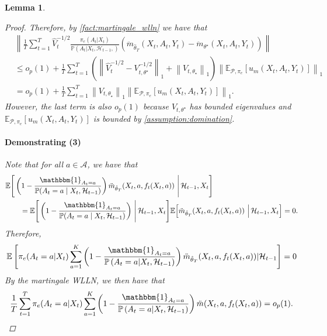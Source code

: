 \documentclass[11pt]{article}
\newcommand{\E}{\mathbb{E}}
\newcommand{\norm}[1]{\left\lVert#1\right\rVert}
\newtheorem{lemma}{Lemma}
\begin{document}
\begin{appendix}
\begin{lemma}
\begin{proof}
Therefore, by \cref{fact:martingale_wlln} we have that
\begin{align*}
&\norm{\frac{1}{T} \sum_{t=1}^{T}\hat{V}_{t}^{-1/2}\frac{\pi_{e}(A_{t} | X_{t})}{\mathbb{P} \left(A_{t} | X_{t},\mathcal{H}_{t-1},\right) }
\left(\ddot{m}_{\hat{\theta}_{T}}(X_{t},A_{t},Y_{t}) - \ddot{m}_{\theta^{\star}}(X_{t},A_{t},Y_{t}) \right)} \\
&\le o_p(1) + \frac{1}{T}\sum_{t=1}^{T}\left(\norm{\hat{V}_{t}^{-1/2} - V_{t,\theta^{\star}}^{-1/2}}_{1} + \norm{V_{t,\theta_{\star}}}_{1}\right) \norm{ \E_{\mathcal{P},\pi_e}\left[u_{m}(X_t,A_t,Y_t) \right]}_{1} \\
&= o_p(1) +  \frac{1}{T}\sum_{t=1}^{T}\norm{V_{t,\theta_{\star}}}_{1} \norm{ \E_{\mathcal{P},\pi_e}\left[u_{m}(X_t,A_t,Y_t) \right]}_{1}.
\end{align*}
However, the last term is also $o_p(1) $ because $V_{t,\theta^{\star}}$ has bounded eigenvalues and $\E_{\mathcal{P},\pi_e}\left[u_{m}(X_t,A_t,Y_t) \right]$ is bounded by \cref{assumption:domination}.



\paragraph{Demonstrating (3)}
Note that for all $a \in \mathcal{A}$, we have that 
\begin{align}
&\E\Bigg[
\left(1 - \frac{\mathbbm{1}_{A_{t} = a}}
{\mathbb{P}\!\left(A_{t} = a \mid X_{t}, \mathcal{H}_{t-1}\right)}\right)
\ddot{m}_{\hat{\theta}_{T}}\!\left(X_{t}, a, f_{t}(X_{t}, a)\right)
\,\Bigg|\, \mathcal{H}_{t-1}, X_{t}
\Bigg] \nonumber \\
&\qquad =
\E\Bigg[
\left(1 - \frac{\mathbbm{1}_{A_{t} = a}}
{\mathbb{P}\!\left(A_{t} = a \mid X_{t}, \mathcal{H}_{t-1}\right)}\right)
\,\Bigg|\, \mathcal{H}_{t-1}, X_{t}
\Bigg]
\E\Big[
\ddot{m}_{\hat{\theta}_{T}}\!\left(X_{t}, a, f_{t}(X_{t}, a)\right)
\,\Big|\, \mathcal{H}_{t-1}, X_{t}
\Big] \nonumber =0 .
\end{align}
Therefore,  
$$\E\left[\pi_{e}(A_{t} =a | X_{t})  \sum_{a=1}^{K} \left(1 - \frac{\mathbbm{1}_{A_{t} = a} }{\mathbb{P} \left(A_{t} =a | X_{t},\mathcal{H}_{t-1} \right)}\right) \ddot{m}_{\hat{\theta}_{T}}(X_{t},a,f_{t}(X_{t},a)) | \mathcal{H}_{t-1}\right] = 0 $$
By the martingale WLLN, we then have that 
$$\frac{1}{T} \sum_{t=1}^{T}\pi_{e}(A_{t} =a | X_{t})  \sum_{a=1}^{K} \left(1 - \frac{\mathbbm{1}_{A_{t} = a} }{\mathbb{P} \left(A_{t} =a | X_{t},\mathcal{H}_{t-1} \right)}\right) \ddot{m}(X_{t},a,f_{t}(X_{t},a)) =o_{p}(1).$$


\end{proof}
\end{lemma}
\end{appendix}
\end{document}
